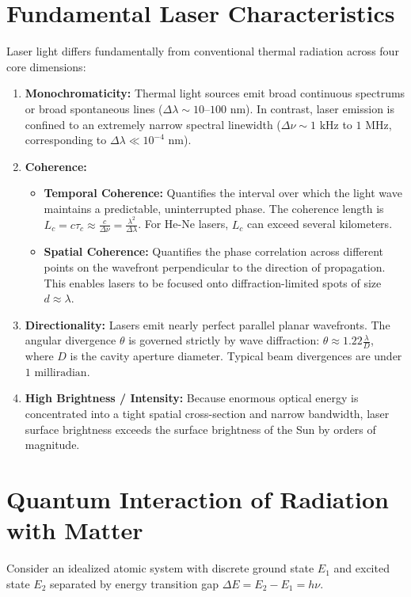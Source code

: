 \section{Fundamental Laser Characteristics}
Laser light differs fundamentally from conventional thermal radiation across four core dimensions:
\begin{enumerate}[leftmargin=*,itemsep=3pt]
    \item \textbf{Monochromaticity:} Thermal light sources emit broad continuous spectrums or broad spontaneous lines ($\Delta\lambda \sim 10\text{--}100\text{ nm}$). In contrast, laser emission is confined to an extremely narrow spectral linewidth ($\Delta\nu \sim 1\text{ kHz}$ to $1\text{ MHz}$, corresponding to $\Delta\lambda \ll 10^{-4}\text{ nm}$).
    \item \textbf{Coherence:}
    \begin{itemize}
        \item \textbf{Temporal Coherence:} Quantifies the interval over which the light wave maintains a predictable, uninterrupted phase. The coherence length is $L_c = c \tau_c \approx \frac{c}{\Delta\nu} = \frac{\lambda^2}{\Delta\lambda}$. For He-Ne lasers, $L_c$ can exceed several kilometers.
        \item \textbf{Spatial Coherence:} Quantifies the phase correlation across different points on the wavefront perpendicular to the direction of propagation. This enables lasers to be focused onto diffraction-limited spots of size $d \approx \lambda$.
    \end{itemize}
    \item \textbf{Directionality:} Lasers emit nearly perfect parallel planar wavefronts. The angular divergence $\theta$ is governed strictly by wave diffraction: $\theta \approx 1.22 \frac{\lambda}{D}$, where $D$ is the cavity aperture diameter. Typical beam divergences are under $1\text{ milliradian}$.
    \item \textbf{High Brightness / Intensity:} Because enormous optical energy is concentrated into a tight spatial cross-section and narrow bandwidth, laser surface brightness exceeds the surface brightness of the Sun by orders of magnitude.
\end{enumerate}

\section{Quantum Interaction of Radiation with Matter}
Consider an idealized atomic system with discrete ground state $E_1$ and excited state $E_2$ separated by energy transition gap $\Delta E = E_2 - E_1 = h\nu$.

